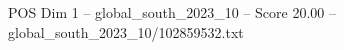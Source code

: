 \begin{textsample}{POS Dim 1 – global\_south\_2023\_10 – Score 20.00 – global\_south\_2023\_10/102859532.txt}
\end{textsample}
